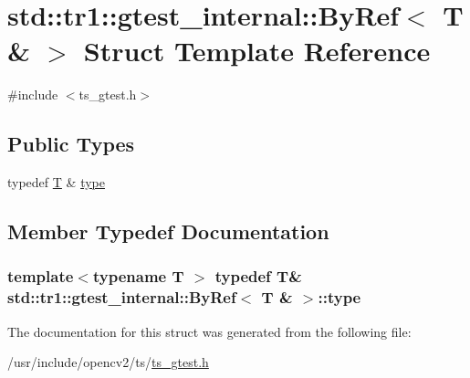 \hypertarget{structstd_1_1tr1_1_1gtest__internal_1_1ByRef_3_01T_01_6_01_4}{\section{std\-:\-:tr1\-:\-:gtest\-\_\-internal\-:\-:By\-Ref$<$ T \& $>$ Struct Template Reference}
\label{structstd_1_1tr1_1_1gtest__internal_1_1ByRef_3_01T_01_6_01_4}
}


{\ttfamily \#include $<$ts\-\_\-gtest.\-h$>$}

\subsection*{Public Types}
\begin{DoxyCompactItemize}
\item 
typedef \hyperlink{calib3d_8hpp_a3efb9551a871ddd0463079a808916717}{T} \& \hyperlink{structstd_1_1tr1_1_1gtest__internal_1_1ByRef_3_01T_01_6_01_4_a512382574dbdd736320d68e313801122}{type}
\end{DoxyCompactItemize}


\subsection{Member Typedef Documentation}
\hypertarget{structstd_1_1tr1_1_1gtest__internal_1_1ByRef_3_01T_01_6_01_4_a512382574dbdd736320d68e313801122}{
\subsubsection[{type}]{\setlength{\rightskip}{0pt plus 5cm}template$<$typename T $>$ typedef {\bf T}\& {\bf std\-::tr1\-::gtest\-\_\-internal\-::\-By\-Ref}$<$ {\bf T} \& $>$\-::{\bf type}}}\label{structstd_1_1tr1_1_1gtest__internal_1_1ByRef_3_01T_01_6_01_4_a512382574dbdd736320d68e313801122}


The documentation for this struct was generated from the following file\-:\begin{DoxyCompactItemize}
\item 
/usr/include/opencv2/ts/\hyperlink{ts__gtest_8h}{ts\-\_\-gtest.\-h}\end{DoxyCompactItemize}
